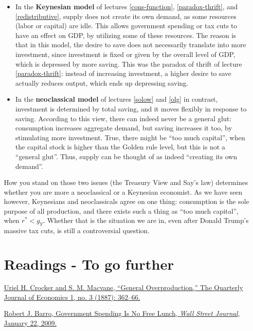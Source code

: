 \documentclass[]{book}
\theoremstyle{definition}
\theoremstyle{definition}
\theoremstyle{definition}
\theoremstyle{remark}
\begin{document}
\begin{itemize}
\item
  In the \textbf{Keynesian model} of lectures \ref{cons-function},
  \ref{paradox-thrift}, and \ref{redistributive}, supply does not create
  its own demand, as some resources (labor or capital) are idle. This
  allows government spending or tax cuts to have an effect on GDP, by
  utilizing some of these resources. The reason is that in this model,
  the desire to save does not necessarily translate into more
  investment, since investment is fixed or given by the overall level of
  GDP, which is depressed by more saving. This was the paradox of thrift
  of lecture \ref{paradox-thrift}: instead of increasing investment, a
  higher desire to save actually reduces output, which ends up
  depressing saving.
\item
  In the \textbf{neoclassical model} of lectures \ref{solow} and
  \ref{olg} in contrast, investment is determined by total saving, and
  it moves flexibly in response to saving. According to this view, there
  can indeed never be a general glut: consumption increases aggregate
  demand, but saving increases it too, by stimulating more investment.
  True, there might be ``too much capital'', when the capital stock is
  higher than the Golden rule level, but this is not a ``general glut''.
  Thus, supply can be thought of as indeed ``creating its own demand''.
\end{itemize}

How you stand on those two issues (the Treasury View and Say's law)
determines whether you are more a neoclassical or a Keynesian economist.
As we have seen however, Keynesians and neoclassicals agree on one
thing: consumption is the sole purpose of all production, and there
exists such a thing as ``too much capital'', when \(r^{*}<g_Y\). Whether
that is the situation we are in, even after Donald Trump's massive tax
cuts, is still a controversial question.

\section*{Readings - To go further}\label{readings---to-go-further-9}

\href{https://doi.org/10.2307/1882763}{Uriel H. Crocker and S. M.
Macvane, ``General Overproduction,'' The Quarterly Journal of Economics
1, no. 3 (1887): 362--66.}

\href{https://search.proquest.com/docview/399114897/CBD1D9A468D04A85PQ/2?accountid=14512}{Robert
J. Barro, Government Spending Is No Free Lunch, \emph{Wall Street
Journal}, January 22, 2009.}
\end{document}
